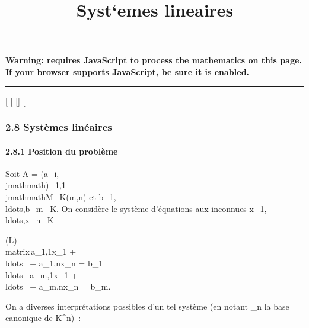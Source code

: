 \documentclass[]{article}
\title{Syst`emes lineaires}
\author{}
\date{}
\begin{document}
\maketitle

\textbf{Warning: 
requires JavaScript to process the mathematics on this page.\\ If your
browser supports JavaScript, be sure it is enabled.}

\begin{center}\rule{3in}{0.4pt}\end{center}

{[}
{[}
{[}{]}
{[}

\subsubsection{2.8 Systèmes linéaires}

\paragraph{2.8.1 Position du problème}

Soit A = (a_i,\\jmathmath)_1\leqi\leqm,1\leq\\jmathmath\leqn \in M_K(m,n) et
b_1,\\ldots,b_m~
\in K. On considère le système d'équations aux inconnues
x_1,\\ldots,x_n~
\in K

(L)\quad \left
\\matrix\,a_1,1x_1
+ \\ldots~ +
a_1,nx_n = b_1 \cr
\\ldots~
\cr a_m,1x_1 +
\\ldots~ +
a_m,nx_n = b_m\right .

On a diverses interprétations possibles d'un tel système (en notant
\textCan_n la base canonique de
K^n)~:
\end{document}
